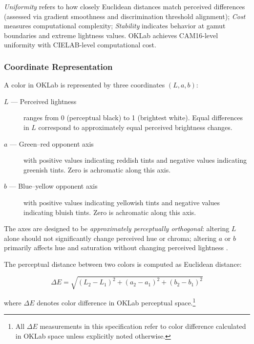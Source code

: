 \textit{Uniformity} refers to how closely Euclidean distances match perceived differences (assessed via gradient smoothness and discrimination threshold alignment); \textit{Cost} measures computational complexity; \textit{Stability} indicates behavior at gamut boundaries and extreme lightness values. OKLab achieves CAM16-level uniformity with CIELAB-level computational cost.

\subsubsection{Coordinate Representation}

A color in OKLab is represented by three coordinates $(L, a, b)$:

\begin{description}
    \item[$L$ --- Perceived lightness] ranges from 0 (perceptual black) to 1 (brightest white). Equal differences in $L$ correspond to approximately equal perceived brightness changes.
    
    \item[$a$ --- Green–red opponent axis] with positive values indicating reddish tints and negative values indicating greenish tints. Zero is achromatic along this axis.
    
    \item[$b$ --- Blue–yellow opponent axis] with positive values indicating yellowish tints and negative values indicating bluish tints. Zero is achromatic along this axis.
\end{description}

The axes are designed to be \emph{approximately perceptually orthogonal}: altering $L$ alone should not significantly change perceived hue or chroma; altering $a$ or $b$ primarily affects hue and saturation without changing perceived lightness \citep{ottosson2020}.

The perceptual distance between two colors is computed as Euclidean distance:

\begin{equation}
    \Delta E = \sqrt{(L_2 - L_1)^2 + (a_2 - a_1)^2 + (b_2 - b_1)^2}
    \label{eq:oklab-distance}
\end{equation}

\noindent where $\Delta E$ denotes color difference in OKLab perceptual space.\footnote{All $\Delta E$ measurements in this specification refer to color difference calculated in OKLab space unless explicitly noted otherwise.}

